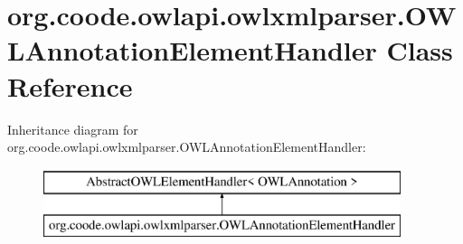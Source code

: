 \hypertarget{classorg_1_1coode_1_1owlapi_1_1owlxmlparser_1_1_o_w_l_annotation_element_handler}{\section{org.\-coode.\-owlapi.\-owlxmlparser.\-O\-W\-L\-Annotation\-Element\-Handler Class Reference}
\label{classorg_1_1coode_1_1owlapi_1_1owlxmlparser_1_1_o_w_l_annotation_element_handler}
}
Inheritance diagram for org.\-coode.\-owlapi.\-owlxmlparser.\-O\-W\-L\-Annotation\-Element\-Handler\-:\begin{figure}[H]
\begin{center}
\leavevmode
\includegraphics[height=2.000000cm]{classorg_1_1coode_1_1owlapi_1_1owlxmlparser_1_1_o_w_l_annotation_element_handler}
\end{center}
\end{figure}
